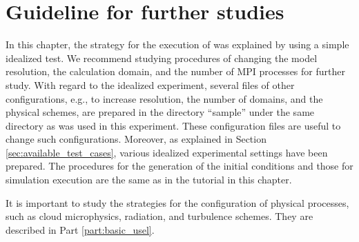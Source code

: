 \section{Guideline for further studies} \label{sec:ideal_exp_last}

In this chapter,
the strategy for the execution of \scaledg was explained by using a simple idealized test. 
We recommend studying procedures of changing the model resolution, 
the calculation domain, and the number of MPI processes for further study. 
With regard to the idealized experiment, several files of other configurations, 
e.g., to increase resolution, the number of domains, and the physical schemes, are prepared in the directory ``sample'' under the same directory as was used in this experiment. 
These configuration files are useful to change such configurations.  
Moreover, as explained in Section \ref{sec:available_test_cases}, various idealized experimental settings  have been prepared. 
The procedures for the generation of the initial conditions and those for simulation execution are the same as in the tutorial in this chapter.

It is important to study the strategies for the configuration of physical processes, such as cloud microphysics, radiation, and turbulence schemes. 
They are described in Part \ref{part:basic_usel}.

